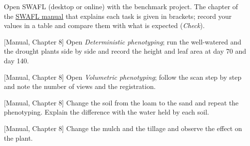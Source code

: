 {\small Open SWAFL (desktop or online) with the benchmark project. The chapter of the \href{https://github.com/halilunaziru73-creator/Coupled-Water-Fluxes-Pore-Scale-Dynamics-Precision-Irrigation-Mulching-Feedback-Loops/raw/main/Software/v1.1.0/SWAFL_Desktop/docs/manual_v1.1.0/SWAFL_Manual_v1.1.0.pdf}{SWAFL manual} that explains each task is given in brackets; record your values in a table and compare them with what is expected (\emph{Check}).}\par\vspace{3pt}
\begin{exlist}
\item {\color{khblue}[Manual, Chapter 8]} Open \emph{Deterministic phenotyping}; run the well-watered and the drought plants side by side and record the height and leaf area at day 70 and day 140.\par{}
\item {\color{khblue}[Manual, Chapter 8]} Open \emph{Volumetric phenotyping}; follow the scan step by step and note the number of views and the registration.\par{}
\item {\color{khblue}[Manual, Chapter 8]} Change the soil from the loam to the sand and repeat the phenotyping. Explain the difference with the water held by each soil.\par{}
\item {\color{khblue}[Manual, Chapter 8]} Change the mulch and the tillage and observe the effect on the plant.\par{}
\end{exlist}
